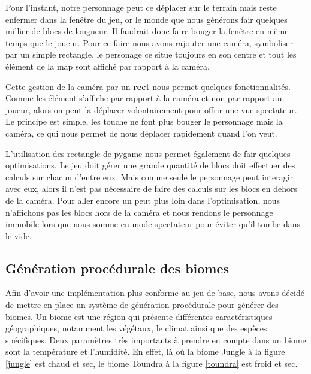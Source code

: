 \documentclass{article}
\begin{document}
Pour l'instant, notre personnage peut ce déplacer sur le terrain mais reste enfermer dans la fenêtre du jeu, or le monde que nous générons fair quelques millier de blocs de longueur. Il faudrait donc faire bouger la fenêtre en même temps que le joueur. Pour ce faire nous avons rajouter une caméra, symboliser par un simple rectangle. le personage ce situe toujours en son centre et tout les élément de la map sont affiché par rapport à la caméra.\par
Cette gestion de la caméra par un \textbf{rect} nous permet quelques fonctionnalités. Comme les élément s'affiche par rapport à la caméra et non par rapport au joueur, alors on peut la déplacer volontairement pour offrir une vue spectateur. Le principe est simple, les touche ne font plus bouger le personnage mais la caméra, ce qui nous permet de nous déplacer rapidement quand l'on veut.\par 
L'utilisation des rectangle de pygame nous permet également de fair quelques optimisations. Le jeu doit gérer une grande quantité de blocs doit effectuer des calculs sur chacun d'entre eux. Mais comme  seule le personnage peut interagir avec eux, alors il n'est pas nécessaire de faire des calculs sur les blocs en dehors de la caméra. Pour aller encore un peut plus loin dans l'optimisation, nous n'affichons pas les blocs hors de la caméra et nous rendons le personnage immobile lors que nous somme en mode spectateur pour éviter qu'il tombe dans le vide.

\subsection{Génération procédurale des biomes}

Afin d'avoir une implémentation plus conforme au jeu de base, nous avons décidé de mettre en place un système de génération procédurale pour générer des biomes.
Un biome est une région qui présente différentes caractéristiques géographiques, notamment les végétaux, le climat ainsi que des espèces spécifiques. Deux paramètres très importants à prendre en compte dans un biome sont la température et l'humidité. En effet, là où la biome Jungle à la figure \ref{jungle} est chaud et sec, le biome Toundra à la figure \ref{toundra} est froid et sec.\par
\end{document}
